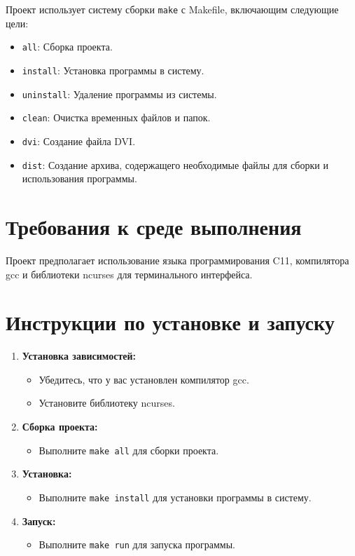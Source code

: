 \documentclass[11pt,a4paper]{article}
\begin{document}
Проект использует систему сборки \texttt{make} с Makefile, включающим следующие цели:

\begin{itemize}
    \item \texttt{all}: Сборка проекта.
    \item \texttt{install}: Установка программы в систему.
    \item \texttt{uninstall}: Удаление программы из системы.
    \item \texttt{clean}: Очистка временных файлов и папок.
    \item \texttt{dvi}: Создание файла DVI.
    \item \texttt{dist}: Создание архива, содержащего необходимые файлы для сборки и использования программы.
\end{itemize}

\section{Требования к среде выполнения}

Проект предполагает использование языка программирования C11, компилятора gcc и библиотеки ncurses для терминального интерфейса.

\section{Инструкции по установке и запуску}

\begin{enumerate}
    \item \textbf{Установка зависимостей:}
        \begin{itemize}
            \item Убедитесь, что у вас установлен компилятор gcc.
            \item Установите библиотеку ncurses.
        \end{itemize}
    \item \textbf{Сборка проекта:}
        \begin{itemize}
            \item Выполните \texttt{make all} для сборки проекта.
        \end{itemize}
    \item \textbf{Установка:}
        \begin{itemize}
            \item Выполните \texttt{make install} для установки программы в систему.
        \end{itemize}
    \item \textbf{Запуск:}
        \begin{itemize}
            \item Выполните \texttt{make run} для запуска программы.
        \end{itemize}
\end{enumerate}
\end{document}
